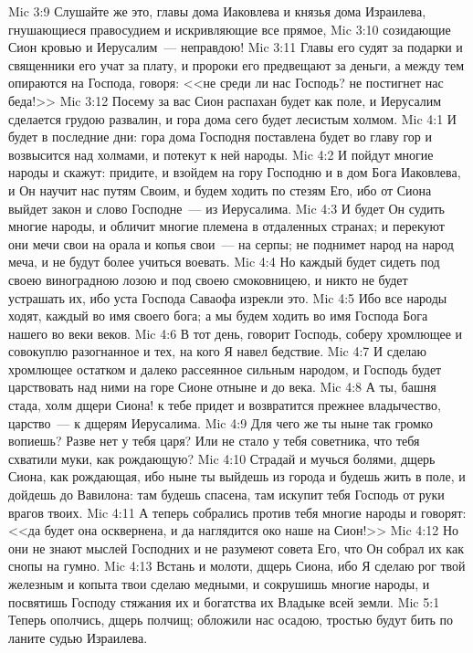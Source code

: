 \vs Mic 3:9 Слушайте же это, главы дома Иаковлева и князья дома Израилева, гнушающиеся правосудием и искривляющие все прямое,
\vs Mic 3:10 созидающие Сион кровью и Иерусалим~--- неправдою!
\vs Mic 3:11 Главы его судят за подарки и священники его учат за плату, и пророки его предвещают за деньги, а между тем опираются на Господа, говоря: <<не среди ли нас Господь? не постигнет нас беда!>>
\vs Mic 3:12 Посему за вас Сион распахан будет как поле, и Иерусалим сделается грудою развалин, и гора дома сего будет лесистым холмом.
\vs Mic 4:1 И будет в последние дни: гора дома Господня поставлена будет во главу гор и возвысится над холмами, и потекут к ней народы.
\vs Mic 4:2 И пойдут многие народы и скажут: придите, и взойдем на гору Господню и в дом Бога Иаковлева, и Он научит нас путям Своим, и будем ходить по стезям Его, ибо от Сиона выйдет закон и слово Господне~--- из Иерусалима.
\vs Mic 4:3 И будет Он судить многие народы, и обличит многие племена в отдаленных странах; и перекуют они мечи свои на орала и копья свои~--- на серпы; не поднимет народ на народ меча, и не будут более учиться воевать.
\vs Mic 4:4 Но каждый будет сидеть под своею виноградною лозою и под своею смоковницею, и никто не будет устрашать их, ибо уста Господа Саваофа изрекли это.
\vs Mic 4:5 Ибо все народы ходят, каждый во имя своего бога; а мы будем ходить во имя Господа Бога нашего во веки веков.
\vs Mic 4:6 В тот день, говорит Господь, соберу хромлющее и совокуплю разогнанное и тех, на кого Я навел бедствие.
\vs Mic 4:7 И сделаю хромлющее остатком и далеко рассеянное сильным народом, и Господь будет царствовать над ними на горе Сионе отныне и до века.
\vs Mic 4:8 А ты, башня стада, холм дщери Сиона! к тебе придет и возвратится прежнее владычество, царство~--- к дщерям Иерусалима.
\vs Mic 4:9 Для чего же ты ныне так громко вопиешь? Разве нет у тебя царя? Или не стало у тебя советника, что тебя схватили муки, как рождающую?
\vs Mic 4:10 Страдай и мучься болями, дщерь Сиона, как рождающая, ибо ныне ты выйдешь из города и будешь жить в поле, и дойдешь до Вавилона: там будешь спасена, там искупит тебя Господь от руки врагов твоих.
\vs Mic 4:11 А теперь собрались против тебя многие народы и говорят: <<да будет она осквернена, и да наглядится око наше на Сион!>>
\vs Mic 4:12 Но они не знают мыслей Господних и не разумеют совета Его, что Он собрал их как снопы на гумно.
\vs Mic 4:13 Встань и молоти, дщерь Сиона, ибо Я сделаю рог твой железным и копыта твои сделаю медными, и сокрушишь многие народы, и посвятишь Господу стяжания их и богатства их Владыке всей земли.
\vs Mic 5:1 Теперь ополчись, дщерь полчищ; обложили нас осадою, тростью будут бить по ланите судью Израилева.
